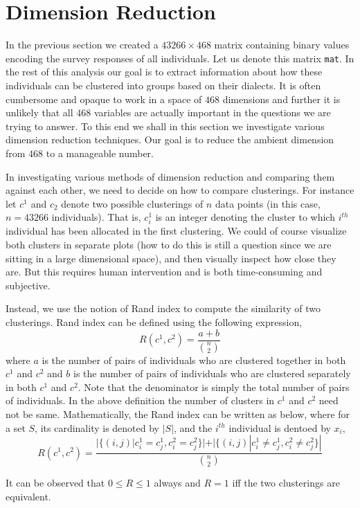 \section{Dimension Reduction}
\label{sec:dimred}

In the previous section we created a $43266 \times 468$ matrix containing binary values encoding the survey responses of all individuals. Let us denote this matrix \verb|mat|. In the rest of this analysis our goal is to extract information about how these individuals can be clustered into groups based on their dialects. It is often cumbersome and opaque to work in a space of $468$ dimensions and further it is unlikely that all $468$ variables are actually important in the questions we are trying to answer. To this end we shall in this section we investigate various dimension reduction techniques. Our goal is to reduce the ambient dimension from $468$ to a manageable number.

In investigating various methods of dimension reduction and comparing them against each other, we need to decide on how to compare clusterings. For instance let $c^1$ and $c_2$ denote two possible clusterings of $n$ data points (in this case, $n = 43266$ individuals). That is, $c^1_i$ is an integer denoting the cluster to which $i^{th}$ individual has been allocated in the first clustering. We could of course visualize both clusters in separate plots (how to do this is still a question since we are sitting in a large dimensional space), and then visually inspect how close they are. But this requires human intervention and is both time-consuming and subjective.

Instead, we use the notion of Rand index \cite{randindex} to compute the similarity of two clusterings. Rand index can be defined using the following expression,
$$
R(c^1,c^2) = \frac{a+b}{{n \choose 2}}
$$
where $a$ is the number of pairs of individuals who are clustered together in both $c^1$ and $c^2$ and $b$ is the number of pairs of individuals who are clustered separately in both $c^1$ and $c^2$. Note that the denominator is simply the total number of pairs of individuals. In the above definition the number of clusters in $c^1$ and $c^2$ need not be same. Mathematically, the Rand index can be written as below, where for a set $S$, its cardinality is denoted by $|S|$, and the $i^{th}$ individual is dentoed by $x_i$,
$$
R(c^1,c^2) = \frac{|\{(i,j)|c^1_i = c^1_j, c^2_i = c^2_j \}| + |\{(i,j)|c^1_i \neq c^1_j, c^2_i \neq c^2_j \}|    }{{n \choose 2}}
$$

It can be observed that $0 \leq R \leq 1$ always and $R = 1$ iff the two clusterings are equivalent.

